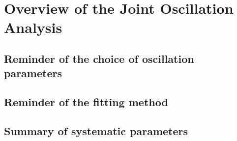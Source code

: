
\section {Overview of the Joint Oscillation Analysis}
\label{sec:overview}

\subsection{Reminder of the choice of oscillation parameters}
\label{sec:overview:oscparamchoice}

\subsection{Reminder of the fitting method}
\label{sec:overview:fitting}

\subsection{Summary of systematic parameters}
\label{sec:overview:syst}
